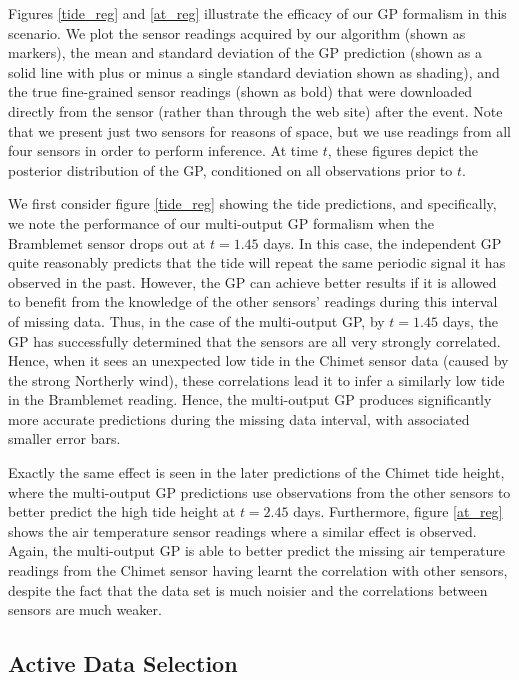 \documentclass{acmtrans2m}
\begin{document}
\noindent Figures \ref{tide_reg} and \ref{at_reg} illustrate the efficacy of our GP formalism in this scenario. We plot the sensor readings acquired by our algorithm (shown as markers), the mean and standard deviation of the GP prediction (shown as a solid line with plus or minus a single standard deviation shown as shading), and the true fine-grained sensor readings (shown as bold) that were downloaded directly from the sensor (rather than through the web site) after the event. Note that we present just two sensors for reasons of space, but we use readings from all four sensors in order to perform inference. At time $t$, these figures depict the posterior distribution of the GP, conditioned on all observations prior to $t$.

We first consider figure \ref{tide_reg} showing the tide predictions, and specifically, we note the performance of our multi-output GP formalism when the Bramblemet sensor drops out at $t=1.45$ days. In this case, the independent GP quite reasonably predicts that the tide will repeat the same periodic signal it has observed in the past. However, the GP can achieve better results if it is allowed to benefit from the knowledge of the other sensors' readings during this interval of missing data. Thus, in the case of the multi-output GP, by $t=1.45$ days, the GP has successfully determined that the sensors are all very strongly correlated. Hence, when it sees an unexpected low tide in the Chimet sensor data (caused by the strong Northerly wind), these correlations lead it to infer a similarly low tide in the Bramblemet reading. Hence, the multi-output GP produces significantly more accurate predictions during the missing data interval, with associated smaller error bars.

Exactly the same effect is seen in the later predictions of the Chimet tide height, where the multi-output GP predictions use observations from the other sensors to better predict the high tide height at $t=2.45$ days. Furthermore, figure \ref{at_reg} shows the air temperature sensor readings where a similar effect is observed. Again, the multi-output GP is able to better predict the missing air temperature readings from the Chimet sensor having learnt the correlation with other sensors, despite the fact that the data set is much noisier and the correlations between sensors are much weaker.

\subsection{Active Data Selection}
\end{document}
